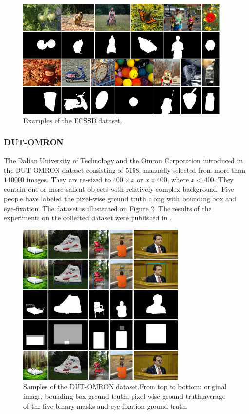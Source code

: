 \begin{figure}[h]
\begin{center}
\includegraphics[width=0.95\textwidth]{fig/ECSSD}
\end{center}
\caption{Examples of the ECSSD dataset.}
\label{fig:ecssd}
\end{figure}

\subsubsection{DUT-OMRON}
The Dalian University of Technology and the Omron Corporation introduced in the DUT-OMRON dataset \cite{dut-omron_db} consisting of $5168$, manually selected from more than $140 000$ images. They are re-sized to $400 \times x$ or $x \times 400$, where  $x < 400$. They contain one or more salient objects with relatively complex background. Five people have labeled the pixel-wise ground truth along with bounding box and eye-fixation. The dataset is illustrated on Figure \ref{fig:dut-omron}. The results of the experiments on the collected dataset were published in \cite{yang2013saliency}.

\begin{figure}[h]
\begin{center}
\includegraphics[width=0.75\textwidth]{fig/DUT-OMRON}
\end{center}
\caption{Samples of the DUT-OMRON dataset.From top to bottom: original image, bounding box ground truth, pixel-wise ground truth,average of the five binary masks and eye-fixation ground truth. }
\label{fig:dut-omron}
\end{figure}

